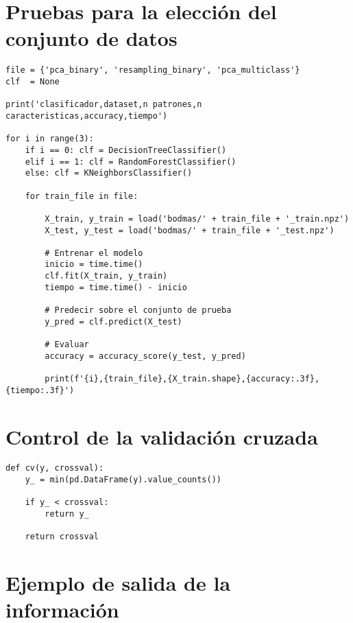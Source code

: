 \newpage
\section{Pruebas para la elección del conjunto de datos}
\label{sec:select_dataset}

\lstset{style=codestyle, language=Python}
\begin{lstlisting}[frame=single]
file = {'pca_binary', 'resampling_binary', 'pca_multiclass'}
clf  = None

print('clasificador,dataset,n patrones,n caracteristicas,accuracy,tiempo')

for i in range(3):
	if i == 0: clf = DecisionTreeClassifier()
	elif i == 1: clf = RandomForestClassifier()
	else: clf = KNeighborsClassifier()

	for train_file in file:

		X_train, y_train = load('bodmas/' + train_file + '_train.npz')
		X_test, y_test = load('bodmas/' + train_file + '_test.npz')

		# Entrenar el modelo
		inicio = time.time()
		clf.fit(X_train, y_train)
		tiempo = time.time() - inicio

		# Predecir sobre el conjunto de prueba
		y_pred = clf.predict(X_test)

		# Evaluar
		accuracy = accuracy_score(y_test, y_pred)

		print(f'{i},{train_file},{X_train.shape},{accuracy:.3f},{tiempo:.3f}')

\end{lstlisting}

\newpage
\section{Control de la validación cruzada}
\label{sec:func_cv}

\lstset{style=codestyle, language=Python}
\begin{lstlisting}[frame=single]
def cv(y, crossval):
	y_ = min(pd.DataFrame(y).value_counts())

	if y_ < crossval:
		return y_

	return crossval
\end{lstlisting}

\section{Ejemplo de salida de la información}
\label{sec:info}

